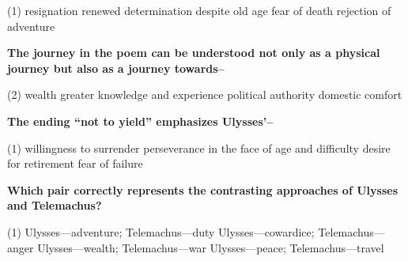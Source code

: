 \documentclass[12pt,a4paper]{exam}
\begin{document}
\begin{questions}
\begin{minipage}{\textwidth}
		\begin{tasks}(1)
			\task resignation
			\task renewed determination despite old age
			\task fear of death
			\task rejection of adventure
		\end{tasks}
	\end{minipage}


	\begin{minipage}{\textwidth}
		\question \textbf{The journey in the poem can be understood not only as a physical journey but also as a journey towards--}

		\begin{tasks}(2)
			\task wealth
			\task greater knowledge and experience
			\task political authority
			\task domestic comfort
		\end{tasks}
	\end{minipage}


	\begin{minipage}{\textwidth}
		\question \textbf{The ending ``not to yield'' emphasizes Ulysses'--}

		\begin{tasks}(1)
			\task willingness to surrender
			\task perseverance in the face of age and difficulty
			\task desire for retirement
			\task fear of failure
		\end{tasks}
	\end{minipage}


	\begin{minipage}{\textwidth}
		\question \textbf{Which pair correctly represents the contrasting approaches of Ulysses and Telemachus?}

		\begin{tasks}(1)
			\task Ulysses---adventure; Telemachus---duty
			\task Ulysses---cowardice; Telemachus---anger
			\task Ulysses---wealth; Telemachus---war
			\task Ulysses---peace; Telemachus---travel
		\end{tasks}
	\end{minipage}



\end{questions}
\end{document}
